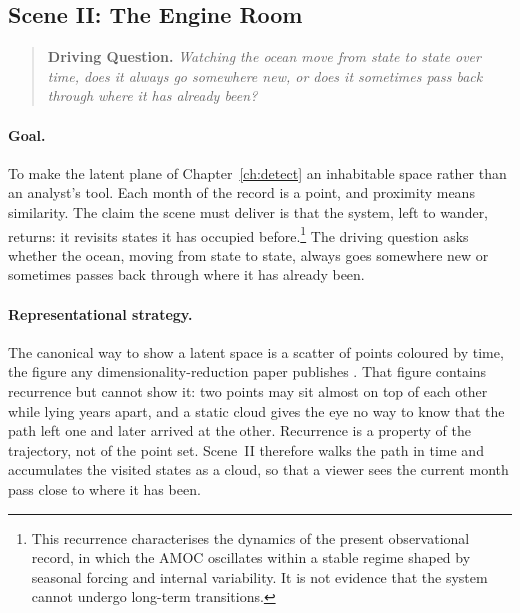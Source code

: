 \subsection{Scene II: The Engine Room}
\label{subsec:scene-engine}

\begin{quote}
\textbf{Driving Question.} \emph{Watching the ocean move from state to state over time, does it always go somewhere new, or does it sometimes pass back through where it has already been?}
\end{quote}


 
\paragraph{Goal.} To make the latent plane of Chapter~\ref{ch:detect} an inhabitable space rather than an analyst's tool. Each month of the record is a point, and proximity means similarity. The claim the scene must deliver is that the system, left to wander, returns: it revisits states it has occupied before.\footnote{This recurrence characterises the dynamics of the present observational record, in which the AMOC oscillates within a stable regime shaped by seasonal forcing and internal variability. It is not evidence that the system cannot undergo long-term transitions.} The driving question asks whether the ocean, moving from state to state, always goes somewhere new or sometimes passes back through where it has already been.
 
\paragraph{Representational strategy.} The canonical way to show a latent space is a scatter of points coloured by time, the figure any dimensionality-reduction paper publishes \parencite{sacha2018}. That figure contains recurrence but cannot show it: two points may sit almost on top of each other while lying years apart, and a static cloud gives the eye no way to know that the path left one and later arrived at the other. Recurrence is a property of the trajectory, not of the point set. Scene~II therefore walks the path in time and accumulates the visited states as a cloud, so that a viewer sees the current month pass close to where it has been.
 

